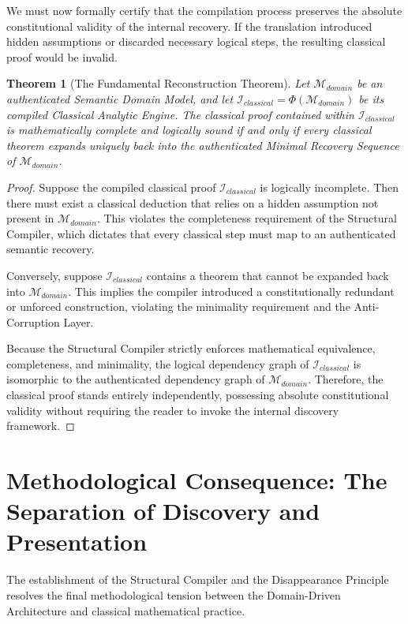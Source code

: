 \documentclass[12pt,openany]{extbook}
\theoremstyle{plain}
\newtheorem{theorem}{Theorem}[chapter]
\theoremstyle{definition}
\begin{document}
We must now formally certify that the compilation process preserves the absolute constitutional validity of the internal recovery. If the translation introduced hidden assumptions or discarded necessary logical steps, the resulting classical proof would be invalid.

\begin{theorem}[The Fundamental Reconstruction Theorem]
Let $\mathcal{M}_{domain}$ be an authenticated Semantic Domain Model, and let $\mathcal{I}_{classical} = \Phi(\mathcal{M}_{domain})$ be its compiled Classical Analytic Engine. The classical proof contained within $\mathcal{I}_{classical}$ is mathematically complete and logically sound if and only if every classical theorem expands uniquely back into the authenticated Minimal Recovery Sequence of $\mathcal{M}_{domain}$.
\end{theorem}

\begin{proof}
Suppose the compiled classical proof $\mathcal{I}_{classical}$ is logically incomplete. Then there must exist a classical deduction that relies on a hidden assumption not present in $\mathcal{M}_{domain}$. This violates the completeness requirement of the Structural Compiler, which dictates that every classical step must map to an authenticated semantic recovery.

Conversely, suppose $\mathcal{I}_{classical}$ contains a theorem that cannot be expanded back into $\mathcal{M}_{domain}$. This implies the compiler introduced a constitutionally redundant or unforced construction, violating the minimality requirement and the Anti-Corruption Layer.

Because the Structural Compiler strictly enforces mathematical equivalence, completeness, and minimality, the logical dependency graph of $\mathcal{I}_{classical}$ is isomorphic to the authenticated dependency graph of $\mathcal{M}_{domain}$. Therefore, the classical proof stands entirely independently, possessing absolute constitutional validity without requiring the reader to invoke the internal discovery framework.
\end{proof}

\section{Methodological Consequence: The Separation of Discovery and Presentation}

The establishment of the Structural Compiler and the Disappearance Principle resolves the final methodological tension between the Domain-Driven Architecture and classical mathematical practice.
\end{document}
